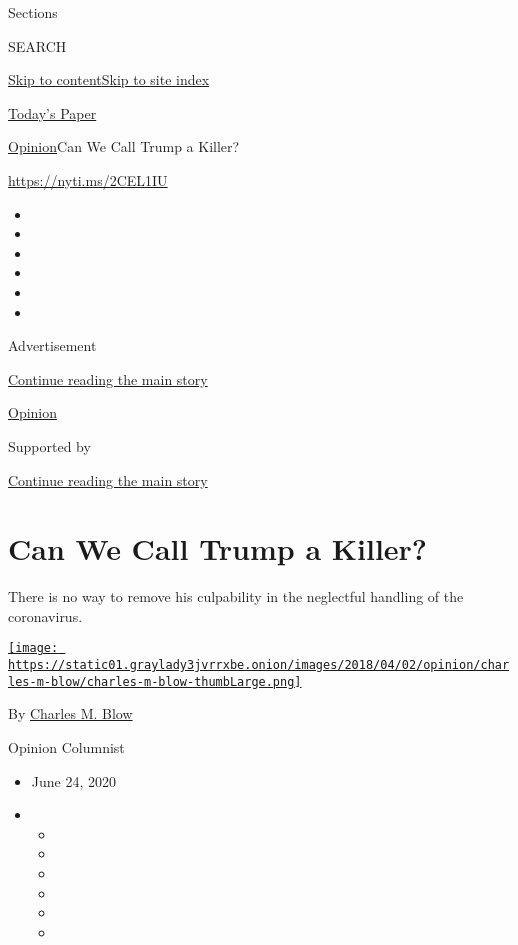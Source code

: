 Sections

SEARCH

\protect\hyperlink{site-content}{Skip to
content}\protect\hyperlink{site-index}{Skip to site index}

\href{https://myaccount.nytimes3xbfgragh.onion/auth/login?response_type=cookie\&client_id=vi}{}

\href{https://www.nytimes3xbfgragh.onion/section/todayspaper}{Today's
Paper}

\href{/section/opinion}{Opinion}\textbar{}Can We Call Trump a Killer?

\url{https://nyti.ms/2CEL1IU}

\begin{itemize}
\item
\item
\item
\item
\item
\item
\end{itemize}

Advertisement

\protect\hyperlink{after-top}{Continue reading the main story}

\href{/section/opinion}{Opinion}

Supported by

\protect\hyperlink{after-sponsor}{Continue reading the main story}

\hypertarget{can-we-call-trump-a-killer}{%
\section{Can We Call Trump a Killer?}\label{can-we-call-trump-a-killer}}

There is no way to remove his culpability in the neglectful handling of
the coronavirus.

\href{https://www.nytimes3xbfgragh.onion/by/charles-m-blow}{\texttt{[image: https://static01.graylady3jvrrxbe.onion/images/2018/04/02/opinion/charles-m-blow/charles-m-blow-thumbLarge.png]}}

By \href{https://www.nytimes3xbfgragh.onion/by/charles-m-blow}{Charles
M. Blow}

Opinion Columnist

\begin{itemize}
\item
  June 24, 2020
\item
  \begin{itemize}
  \item
  \item
  \item
  \item
  \item
  \item
  \end{itemize}
\end{itemize}

